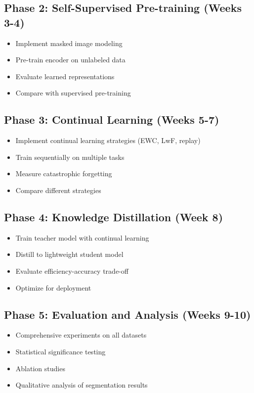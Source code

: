 \documentclass[conference]{IEEEtran}
\begin{document}
\subsection{Phase 2: Self-Supervised Pre-training (Weeks 3-4)}

\begin{itemize}
    \item Implement masked image modeling
    \item Pre-train encoder on unlabeled data
    \item Evaluate learned representations
    \item Compare with supervised pre-training
\end{itemize}

\subsection{Phase 3: Continual Learning (Weeks 5-7)}

\begin{itemize}
    \item Implement continual learning strategies (EWC, LwF, replay)
    \item Train sequentially on multiple tasks
    \item Measure catastrophic forgetting
    \item Compare different strategies
\end{itemize}

\subsection{Phase 4: Knowledge Distillation (Week 8)}

\begin{itemize}
    \item Train teacher model with continual learning
    \item Distill to lightweight student model
    \item Evaluate efficiency-accuracy trade-off
    \item Optimize for deployment
\end{itemize}

\subsection{Phase 5: Evaluation and Analysis (Weeks 9-10)}

\begin{itemize}
    \item Comprehensive experiments on all datasets
    \item Statistical significance testing
    \item Ablation studies
    \item Qualitative analysis of segmentation results
\end{itemize}
\end{document}
